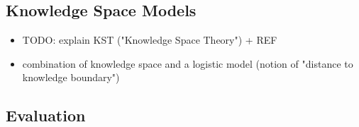 \subsection{Knowledge Space Models}

\begin{itemize}
\item TODO: explain KST ("Knowledge Space Theory") + REF
\item combination of knowledge space and a logistic model
      (notion of "distance to knowledge boundary") \cite{progression-analysis}
\end{itemize}


\subsection{Evaluation}
\label{sec:student-model-evaluation}

